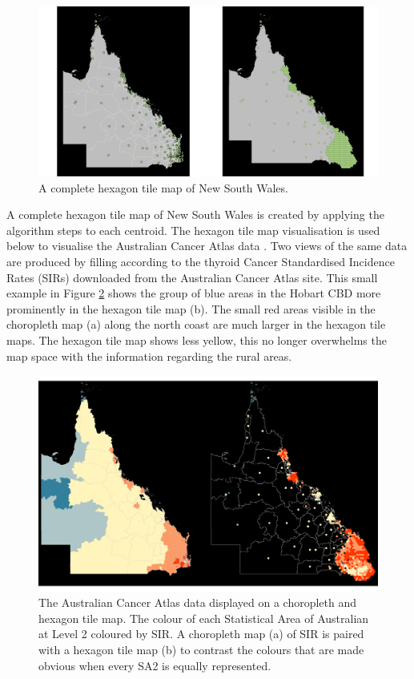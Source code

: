 \begin{figure}[h]
\centering
\includegraphics[width=16cm]{figs/6allocate.png}
\caption{\label{fig:buffs}A complete hexagon tile map of New South Wales.}
\end{figure}

A complete hexagon tile map of New South Wales is created by applying
the algorithm steps to each centroid. The hexagon tile map visualisation
is used below to visualise the Australian Cancer Atlas data
\citep{TACA}. Two views of the same data are produced by filling
according to the thyroid Cancer Standardised Incidence Rates (SIRs)
downloaded from the Australian Cancer Atlas site. This small example in
Figure \ref{fig:sir} shows the group of blue areas in the Hobart CBD
more prominently in the hexagon tile map (b). The small red areas
visible in the choropleth map (a) along the north coast are much larger
in the hexagon tile maps. The hexagon tile map shows less yellow, this
no longer overwhelms the map space with the information regarding the
rural areas.

\begin{figure}[h]
\centering
\includegraphics[width=14cm]{figs/7SIR.png}
\caption{\label{fig:sir}The Australian Cancer Atlas data displayed on a choropleth and hexagon tile map. The colour of each Statistical Area of Australian at Level 2 coloured by SIR. A choropleth map (a) of SIR is paired with a hexagon tile map (b) to contrast the colours that are made obvious when every SA2 is equally represented.}
\end{figure}

